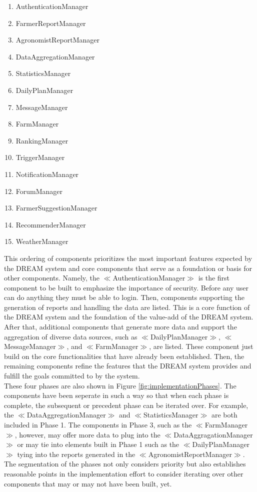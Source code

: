 \begin{enumerate}
\item AuthenticationManager
\item FarmerReportManager
\item AgronomistReportManager
\item DataAggregationManager
\item StatisticsManager
\item DailyPlanManager
\item MessageManager
\item FarmManager
\item RankingManager
\item TriggerManager
\item NotificationManager
\item ForumManager
\item FarmerSuggestionManager
\item RecommenderManager
\item WeatherManager
\end{enumerate}

\begin{flushleft}
This ordering of components prioritizes the most important features expected by the DREAM system and core components that serve as a foundation or basis for other components. Namely, the \(\ll\)AuthenticationManager\(\gg\) is the first component to be built to emphasize the importance of security. Before any user can do anything they must be able to login. Then, components supporting the generation of reports and handling the data are listed. This is a core function of the DREAM system and the foundation of the value-add of the DREAM system. After that, additional components that generate more data and support the aggregation of diverse data sources, such as \(\ll\)DailyPlanManager\(\gg\), \(\ll\)MessageManager\(\gg\), and \(\ll\)FarmManager\(\gg\), are listed. These component just build on the core functionalities that have already been established. Then, the remaining components refine the features that the DREAM system provides and fulfill the goals committed to by the system. \\
\smallskip
These four phases are also shown in Figure \ref{fig:implementationPhases}. The components have been seperate in such a way so that when each phase is complete, the subsequent or precedent phase can be iterated over. For example, the \(\ll\)DataAggregationManager\(\gg\) and \(\ll\)StatisticsManager\(\gg\) are both included in Phase 1. The components in Phase 3, such as the \(\ll\)FarmManager\(\gg\), however, may offer more data to plug into the \(\ll\)DataAggragationManager\(\gg\) or may tie into elements built in Phase 1 such as the \(\ll\)DailyPlanManager\(\gg\) tying into the reports generated in the \(\ll\)AgronomistReportManager\(\gg\). The segmentation of the phases not only considers priority but also establishes reasonable points in the implementation effort to consider iterating over other components that may or may not have been built, yet. 
\end{flushleft}

